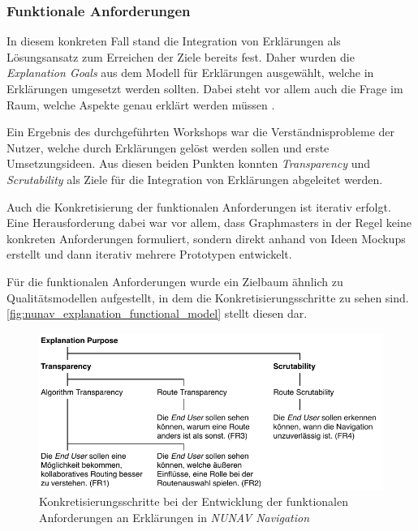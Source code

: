 \subsubsection{Funktionale Anforderungen}

In diesem konkreten Fall stand die Integration von Erklärungen als Lösungsansatz zum Erreichen der Ziele bereits fest. Daher wurden die \textit{Explanation Goals} aus dem Modell für Erklärungen ausgewählt, welche in Erklärungen umgesetzt werden sollten. Dabei steht vor allem auch die Frage im Raum, welche Aspekte genau erklärt werden müssen \cite{kohl_explainability_2019}.

Ein Ergebnis des durchgeführten Workshops war die Verständnisprobleme der Nutzer, welche durch Erklärungen gelöst werden sollen und erste Umsetzungsideen. Aus diesen beiden Punkten konnten \textit{Transparency} und \textit{Scrutability} als Ziele für die Integration von Erklärungen abgeleitet werden.

Auch die Konkretisierung der funktionalen Anforderungen ist iterativ erfolgt. Eine Herausforderung dabei war vor allem, dass Graphmasters in der Regel keine konkreten Anforderungen formuliert, sondern direkt anhand von Ideen Mockups erstellt und dann iterativ mehrere Prototypen entwickelt.

Für die funktionalen Anforderungen wurde ein Zielbaum ähnlich zu Qualitätsmodellen aufgestellt, in dem die Konkretisierungsschritte zu sehen sind. \autoref{fig:nunav_explanation_functional_model} stellt diesen dar.

\begin{figure}[htb!]
    \centering
    \includegraphics[]{contents/06_model_evaluation/01_integration/res/functional_model.pdf}
    \caption{Konkretisierungsschritte bei der Entwicklung der funktionalen Anforderungen an Erklärungen in \textit{NUNAV Navigation}}
    \label{fig:nunav_explanation_functional_model}
\end{figure}

